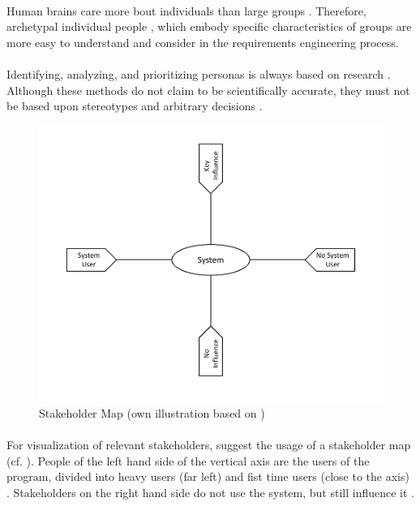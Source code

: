 \paragraph{} Human brains care more bout individuals than large groups \parencite[cf.][]{Platt.2016}. Therefore, archetypal individual people \parencite[cf.][81-82]{Cooper.2007}, which embody specific characteristics of groups \parencite[cf.][]{Platt.2016} are more easy to understand and consider in the requirements engineering process.

\paragraph{} Identifying, analyzing, and prioritizing personas is always based on research \parencites[cf.][39]{Robier.2016}[cf.][80]{Cooper.2007}. Although these methods do not claim to be scientifically accurate, they must not be based upon stereotypes and arbitrary decisions \parencite[cf.][82-83]{Cooper.2007}. 

\begin{figure}[H]
\centering
    \includegraphics[scale=1]{img/stakeholderMap.pdf}
    \caption[Stakeholder Map]{Stakeholder Map (own illustration based on \cite[38]{Robier.2016})}
    \label{fig:stakeMap}
\end{figure}

\paragraph{} For visualization of relevant stakeholders, \textcite[38]{Robier.2016} suggest the usage of a stakeholder map (cf. ). People of the left hand side of the vertical axis are the users of the program, divided into heavy users (far left) and fist time users (close to the axis) \parencite[cf.][38]{Robier.2016}. Stakeholders on the right hand side do not use the system, but still influence it \parencite[cf.][38]{Robier.2016}. 

